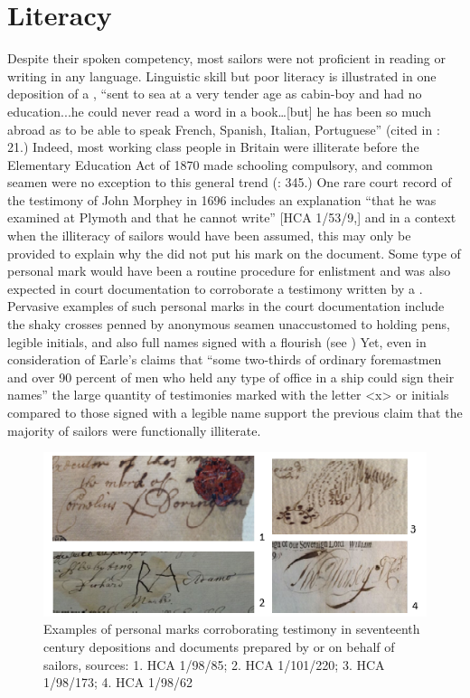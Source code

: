 \section{{Literacy}}\label{sec:3.11}

  Despite their spoken competency, most sailors were not proficient in reading or writing in any language. Linguistic skill but poor literacy is illustrated in one deposition of a , “sent to sea at a very tender age as cabin-boy and had no education...he could never read a word in a book…[but] he has been so much abroad as to be able to speak French, Spanish, Italian, Portuguese” (cited in \citealt{Earle1998}: 21.) Indeed, most working class people in Britain were illiterate before the Elementary Education Act of 1870 made schooling compulsory, and common seamen were no exception to this general trend (\citealt{AdkinsAdkins2008}: 345.) One rare court record of the testimony of John Morphey in 1696 includes an explanation “that he was examined at Plymoth and that he cannot write” [HCA 1/53/9,] and in a context when the illiteracy of sailors would have been assumed, this may only be provided to explain why the  did not put his mark on the document. Some type of personal mark would have been a routine procedure for enlistment and was also expected in court documentation to corroborate a testimony written by a . Pervasive examples of such personal marks in the court documentation include the shaky crosses penned by anonymous seamen unaccustomed to holding pens, legible initials, and also full names signed with a flourish (see ) Yet, even in consideration of Earle’s claims that “some two-thirds of ordinary foremastmen and over 90 percent of men who held any type of office in a ship could sign their names” \citep[20,]{Earle1998} the large quantity of testimonies marked with the letter <x> or initials compared to those signed with a legible name support the previous claim that the majority of sailors were functionally illiterate. 

\begin{figure}
  

\includegraphics[width=\textwidth]{figures/delgado-img7.png}
 

\caption{\label{fig:key:3.7} Examples of personal marks corroborating testimony in seventeenth century depositions and documents prepared by or on behalf of sailors, sources: 1. HCA 1/98/85; 2. HCA 1/101/220; 3. HCA 1/98/173; 4. HCA 1/98/62}
\end{figure}

